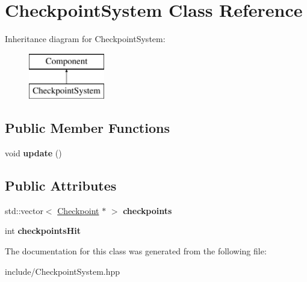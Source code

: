 \hypertarget{class_checkpoint_system}{\section{Checkpoint\-System Class Reference}
\label{class_checkpoint_system}
}
Inheritance diagram for Checkpoint\-System\-:\begin{figure}[H]
\begin{center}
\leavevmode
\includegraphics[height=2.000000cm]{class_checkpoint_system}
\end{center}
\end{figure}
\subsection*{Public Member Functions}
\begin{DoxyCompactItemize}
\item 
\hypertarget{class_checkpoint_system_afdd30317fc98711cce6a83ef3dfa06f3}{void {\bfseries update} ()}\label{class_checkpoint_system_afdd30317fc98711cce6a83ef3dfa06f3}

\end{DoxyCompactItemize}
\subsection*{Public Attributes}
\begin{DoxyCompactItemize}
\item 
\hypertarget{class_checkpoint_system_a781f8bf48c6f9f55f2317745978df227}{std\-::vector$<$ \hyperlink{class_checkpoint}{Checkpoint} $\ast$ $>$ {\bfseries checkpoints}}\label{class_checkpoint_system_a781f8bf48c6f9f55f2317745978df227}

\item 
\hypertarget{class_checkpoint_system_a6379fd4630727bedb048369dfe7f6bbe}{int {\bfseries checkpoints\-Hit}}\label{class_checkpoint_system_a6379fd4630727bedb048369dfe7f6bbe}

\end{DoxyCompactItemize}


The documentation for this class was generated from the following file\-:\begin{DoxyCompactItemize}
\item 
include/Checkpoint\-System.\-hpp\end{DoxyCompactItemize}
